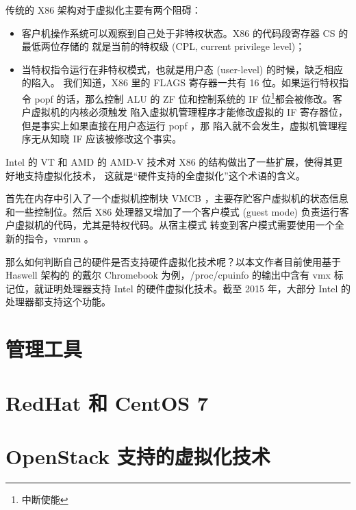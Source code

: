 
传统的 X86 架构对于虚拟化主要有两个阻碍：

\begin{itemize}
    \item 客户机操作系统可以观察到自己处于非特权状态。X86 的代码段寄存器 CS 的最低两位存储的
    就是当前的特权级 (CPL, current privilege level)；
    \item 当特权指令运行在非特权模式，也就是用户态 (user-level) 的时候，缺乏相应的陷入。
    我们知道，X86 里的 FLAGS 寄存器一共有 16 位。如果运行特权指令 popf 的话，那么控制
    ALU 的 ZF 位和控制系统的 IF 位\footnote{中断使能}都会被修改。客户虚拟机的内核必须触发
    陷入虚拟机管理程序才能修改虚拟的 IF 寄存器位，但是事实上如果直接在用户态运行 popf ，那
    陷入就不会发生，虚拟机管理程序无从知晓 IF 应该被修改这个事实。
\end{itemize}

Intel 的 VT 和 AMD 的 AMD-V 技术对 X86 的结构做出了一些扩展，使得其更好地支持虚拟化技术，
这就是“硬件支持的全虚拟化”这个术语的含义。

首先在内存中引入了一个虚拟机控制块 VMCB ，主要存贮客户虚拟机的状态信息和一些控制位。然后 X86
处理器又增加了一个客户模式 (guest mode) 负责运行客户虚拟机的代码，尤其是特权代码。从宿主模式
转变到客户模式需要使用一个全新的指令，vmrun 。

那么如何判断自己的硬件是否支持硬件虚拟化技术呢？以本文作者目前使用基于 Haswell 架构的
的戴尔 Chromebook 为例，/proc/cpuinfo 的输出中含有 vmx 标记位，就证明处理器支持
 Intel 的硬件虚拟化技术。截至 2015 年，大部分 Intel 的处理器都支持这个功能。

\section{管理工具}

\section{RedHat 和 CentOS 7}

\section{OpenStack 支持的虚拟化技术}

